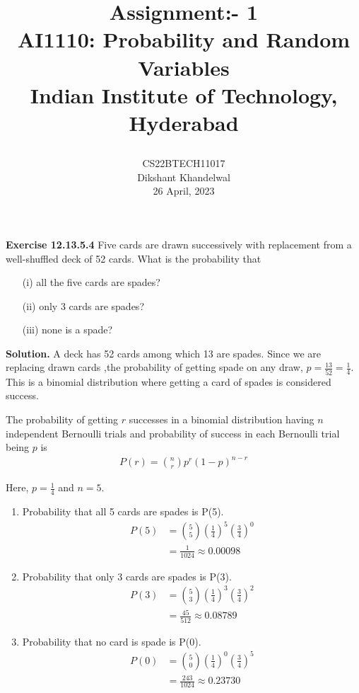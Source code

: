 \documentclass[journal,12pt,twocolumn]{IEEEtran}
\title{

  Assignment:- 1\\
  \Large AI1110: Probability and Random Variables\\
  \Large Indian Institute of Technology, Hyderabad
}
\author{
  CS22BTECH11017\\[4pt]
  Dikshant Khandelwal\\
  26 April, 2023
}
\begin{document}
%

\maketitle

\textbf{Exercise 12.13.5.4} Five cards are drawn successively with replacement from a well-shuffled deck
of 52 cards. What is the probability that
\begin{enumerate}
    \item[(i)] all the five cards are spades?
    \item[(ii)] only 3 cards are spades?
    \item[(iii)] none is a spade?
\end{enumerate}

\textbf{Solution.}  A deck has 52 cards among which 13 are spades. Since we are replacing drawn cards ,the probability of getting spade on any draw, \(p = \frac{13}{52} = \frac{1}{4}\). This is a binomial distribution where getting a card of spades is considered success.

The probability of getting \(r\) successes in a binomial distribution having \(n\) independent Bernoulli trials
and probability of success in each Bernoulli trial being \(p\) is 
\begin{align}P(r) =  \displaystyle\binom{n}{r} p^{r}(1-p)^{n-r} \end{align}

Here, \(p = \displaystyle\frac{1}{4}\) and \(n = 5\).

\begin{enumerate}[label=(\roman*)]
    \item Probability  that  all 5 cards are spades is P(5).
\begin{align}
P(5) &= \binom{5}{5} \left(\frac{1}{4}\right)^{5} \left(\frac{3}{4}\right)^{0}\\
     &= \frac{1}{1024} \approx 0.00098
\end{align}

\item Probability that only 3 cards are spades is P(3).
\begin{align}
P(3) &= \binom{5}{3} \left(\frac{1}{4}\right)^{3} \left(\frac{3}{4}\right)^{2}\\
     &= \frac{45}{512} \approx 0.08789
\end{align}

\item Probability that no card is spade is P(0).
\begin{align}
P(0) &= \binom{5}{0} \left(\frac{1}{4}\right)^{0} \left(\frac{3}{4}\right)^{5}\\
     &= \frac{243}{1024} \approx 0.23730
\end{align}
\end{enumerate}
\end{document}
